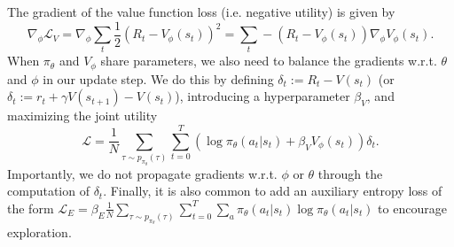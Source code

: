 The gradient of the value function loss (i.e. negative utility) is given by
\begin{equation}
    \nabla_\phi \mathcal{L}_V = \nabla_\phi \sum_t \frac12  (R_t - V_\phi(s_t))^2 = \sum_t - (R_t - V_\phi(s_t)) \nabla_\phi V_\phi(s_t).
\end{equation}
When $\pi_\theta$ and $V_\phi$ share parameters, we also need to balance the gradients w.r.t. $\theta$ and $\phi$ in our update step.
We do this by defining $\delta_t := R_t - V(s_t)$ (or $\delta_t := r_t + \gamma V(s_{t+1}) - V(s_t)$), introducing a hyperparameter $\beta_V$, and maximizing the joint utility
\begin{equation}
    \mathcal{L} = \frac{1}{N} \sum_{\tau \sim p_{\pi_\theta}(\tau)} \sum_{t=0}^T ( \log \pi_\theta (a_t|s_t) + \beta_V V_\phi(s_t) ) \delta_t .
\end{equation}
Importantly, we do not propagate gradients w.r.t. $\phi$ or $\theta$ through the computation of $\delta_t$.
Finally, it is also common to add an auxiliary entropy loss of the form $\mathcal{L}_E = \beta_E \frac{1}{N} \sum_{\tau \sim p_{\pi_\theta}(\tau)} \sum_{t=0}^T \sum_a \pi_\theta (a_t|s_t) \log \pi_\theta (a_t|s_t)$ to encourage exploration.



